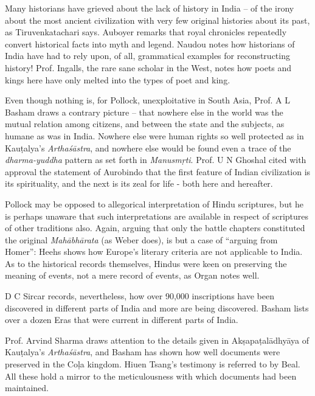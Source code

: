 Many historians have grieved about the lack of history in India – of the irony about the most ancient civilization with very few original histories about its past, as Tiruvenkatachari says. Auboyer remarks that royal chronicles repeatedly convert historical facts into myth and legend. Naudou notes how historians of India have had to rely upon, of all, grammatical examples for reconstructing history! Prof. Ingalls, the rare sane scholar in the West, notes how poets and kings here have only melted into the types of poet and king.

Even though nothing is, for Pollock, unexploitative in South Asia, Prof. A L Basham draws a contrary picture – that nowhere else in the world was the mutual relation among citizens, and between the state and the subjects, as humane as was in India. Nowhere else were human rights so well protected as in Kauṭalya’s \textit{Arthaśāstra}, and nowhere else would be found even a trace of the \textit{dharma-yuddha} pattern as set forth in \textit{Manusmṛti}. Prof. U N Ghoshal cited with approval the statement of Aurobindo that the first feature of Indian civilization is its spirituality, and the next is its zeal for life - both here and hereafter.

Pollock may be opposed to allegorical interpretation of Hindu scriptures, but he is perhaps unaware that such interpretations are available in respect of scriptures of other traditions also. Again, arguing that only the battle chapters constituted the original \textit{Mahābhārata} (as Weber does), is but a case of “arguing from Homer”: Heehs shows how Europe’s literary criteria are not applicable to India. As to the historical records themselves, Hindus were keen on preserving the meaning of events, not a mere record of events, as Organ notes well.

D C Sircar records, nevertheless, how over 90,000 inscriptions have been discovered in different parts of India and more are being discovered. Basham lists over a dozen Eras that were current in different parts of India.

Prof. Arvind Sharma draws attention to the details given in Akṣapaṭalādhyāya of Kauṭalya’s \textit{Arthaśāstra}, and Basham has shown how well documents were preserved in the Coḷa kingdom. Hiuen Tsang’s testimony is referred to by Beal. All these hold a mirror to the meticulousness with which documents had been maintained. 

